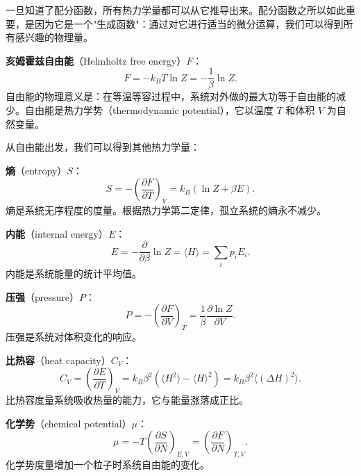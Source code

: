 \begin{theorem}[热力学量与配分函数]
一旦知道了配分函数，所有热力学量都可以从它推导出来。配分函数之所以如此重要，是因为它是一个"生成函数"：通过对它进行适当的微分运算，我们可以得到所有感兴趣的物理量。

\textbf{亥姆霍兹自由能}（Helmholtz free energy）$F$：
\begin{equation}
    F = -k_B T \ln Z = -\frac{1}{\beta} \ln Z.
\end{equation}
自由能的物理意义是：在等温等容过程中，系统对外做的最大功等于自由能的减少。自由能是热力学势（thermodynamic potential），它以温度 $T$ 和体积 $V$ 为自然变量。

从自由能出发，我们可以得到其他热力学量：

\textbf{熵}（entropy）$S$：
\begin{equation}
    S = -\left(\frac{\partial F}{\partial T}\right)_V = k_B (\ln Z + \beta E).
\end{equation}
熵是系统无序程度的度量。根据热力学第二定律，孤立系统的熵永不减少。

\textbf{内能}（internal energy）$E$：
\begin{equation}
    E = -\frac{\partial}{\partial \beta} \ln Z = \langle H \rangle = \sum_i p_i E_i.
\end{equation}
内能是系统能量的统计平均值。

\textbf{压强}（pressure）$P$：
\begin{equation}
    P = -\left(\frac{\partial F}{\partial V}\right)_T = \frac{1}{\beta} \frac{\partial \ln Z}{\partial V}.
\end{equation}
压强是系统对体积变化的响应。

\textbf{比热容}（heat capacity）$C_V$：
\begin{equation}
    C_V = \left(\frac{\partial E}{\partial T}\right)_V = k_B \beta^2 \left( \langle H^2 \rangle - \langle H \rangle^2 \right) = k_B \beta^2 \langle (\Delta H)^2 \rangle.
\end{equation}
比热容度量系统吸收热量的能力，它与能量涨落成正比。

\textbf{化学势}（chemical potential）$\mu$：
\begin{equation}
    \mu = -T \left(\frac{\partial S}{\partial N}\right)_{E,V} = \left(\frac{\partial F}{\partial N}\right)_{T,V}.
\end{equation}
化学势度量增加一个粒子时系统自由能的变化。
\end{theorem}

